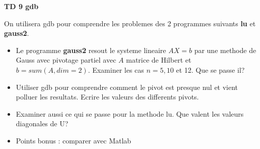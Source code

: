 \documentclass{article}\parskip5pt
\begin{document}
\begin{center}
{\bf TD 9 gdb} \\
\end{center}

On utilisera gdb pour comprendre les problemes des 2 programmes
suivants {\bf lu} et {\bf gauss2}.

\begin{itemize}
\item Le programme {\bf gauss2} resout le systeme lineaire
$AX=b$ par une methode de Gauss avec pivotage partiel avec
$A$ matrice de Hilbert et $b=sum(A,dim=2)$.
Examiner les cas $n=5,10 $ et 12. Que se passe il?
\item Utiliser gdb pour comprendre comment le pivot est presque nul
et vient polluer les resultats. Ecrire les valeurs des differents
pivots.
\item Examiner aussi ce qui se passe pour la methode lu.
Que valent les valeurs diagonales de U?
\item Points bonus : comparer avec Matlab
\end{itemize}
\end{document}
